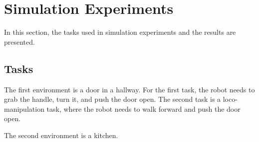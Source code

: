 \chapter{Simulation Experiments}

In this section, the tasks used in simulation experiments and the results are presented. 

\section{Tasks}

The first environment is a door in a hallway. For the first task, the robot needs to grab the handle, turn it, and push the door open. The second task is a loco-manipulation task, where the robot needs to walk forward and push the door open. 

The second environment is a kitchen. 

